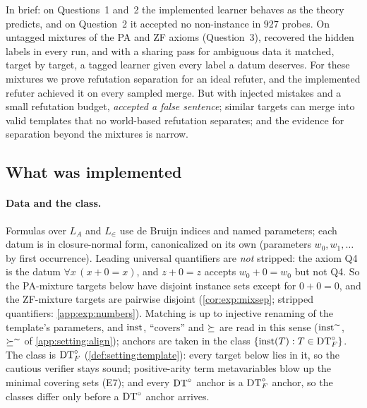 In brief: on Questions~1 and~2 the implemented learner behaves as the theory predicts, and on Question~2 it accepted no non-instance in $927$ probes. On untagged mixtures of the PA and ZF axioms (Question~3), \DTRC{} recovered the hidden labels in every run, and with a sharing pass for ambiguous data it matched, target by target, a tagged learner given every label a datum deserves. For these mixtures we prove refutation separation for an ideal refuter, and the implemented refuter achieved it on every sampled merge. But with injected mistakes and a small refutation budget, \DTRC{} \emph{accepted a false sentence}; similar targets can merge into valid templates that no world-based refutation separates; and the evidence for separation beyond the mixtures is narrow.

\subsection{What was implemented}\label{sec:exp:impl}

\paragraph{Data and the class.}
Formulas over $L_A$ and $L_\in$ use de Bruijn indices and named parameters; each datum is in closure-normal form, canonicalized on its own (parameters $w_0,w_1,\dots$ by first occurrence). Leading universal quantifiers are \emph{not} stripped: the axiom Q4 is the datum $\forall x\,(x+0=x)$, and $z+0=z$ accepts $w_0+0=w_0$ but not Q4. So the PA-mixture targets below have disjoint instance sets except for $0+0=0$, and the ZF-mixture targets are pairwise disjoint (\cref{cor:exp:mixsep}; stripped quantifiers: \cref{app:exp:numbers}). Matching is up to injective renaming of the template's parameters, and $\mathrm{inst}$, ``covers'' and $\succeq$ are read in this sense ($\mathrm{inst}^\sim$, $\succeq^\sim$ of \cref{app:setting:align}); anchors are taken in the class $\{\mathrm{inst}(T):T\in\mathrm{DT}^{\circ}_{F}\}$. The class is $\mathrm{DT}^{\circ}_{F}$ (\cref{def:setting:template}): every target below lies in it, so the cautious verifier stays sound; positive-arity term metavariables blow up the minimal covering sets (E7); and every $\mathrm{DT}^{\circ}$ anchor is a $\mathrm{DT}^{\circ}_{F}$ anchor, so the classes differ only before a $\mathrm{DT}^{\circ}$ anchor arrives.

